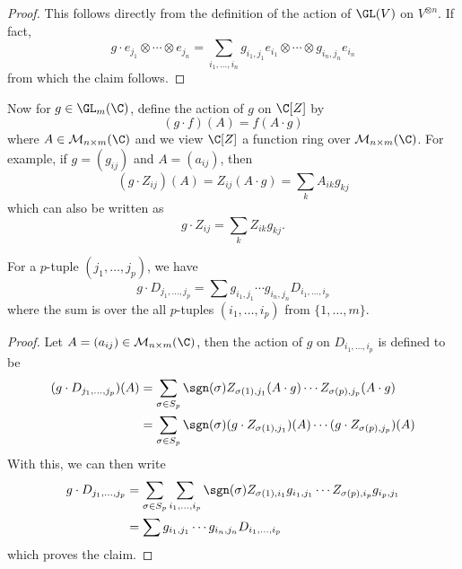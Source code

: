 \begin{proof}
This follows directly from the definition of the action of $\GL(V)$ on $V^{\otimes n}$. If fact,
\[g\cdot e_{j_1}\otimes\cdots\otimes e_{j_n}=\sum_{i_1,\dots,i_n} g_{i_1,j_1}e_{i_1}\otimes\cdots\otimes g_{i_n,j_n}e_{i_n}\]
from which the claim follows.
\end{proof}
Now for $g\in\GL_m(\C)$, define the action of $g$ on $\C[Z]$ by
\[(g\cdot f)(A)=f(A\cdot g)\]
where $A\in\mathcal{M}_{n\times m}(\C)$ and we view $\C[Z]$ a function ring over $\mathcal{M}_{n\times m}(\C)$. For example, if $g=(g_{ij})$ and $A=(a_{ij})$, then
\[(g\cdot Z_{ij})(A)=Z_{ij}(A\cdot g)=\sum_kA_{ik}g_{kj}\]
which can also be written as
\[g\cdot Z_{ij}=\sum_kZ_{ik}g_{kj}.\]
\begin{lemma}
For a $p$-tuple $(j_1,\dots,j_p)$, we have
\[g\cdot D_{j_1,\dots,j_p}=\sum g_{i_1,j_1}\cdots g_{i_n,j_n}D_{i_1,\dots,i_p}\]
where the sum is over the all $p$-tuples $(i_1,\dots,i_p)$ from $\{1,\dots,m\}$.
\end{lemma}
\begin{proof}
Let $A=(a_{ij})\in \mathcal{M}_{n\times m}(\C)$, then the action of $g$ on $D_{i_1,\dots,i_p}$ is defined to be
\begin{align*}
(g\cdot D_{j_1,\dots,j_p})(A)&=\sum_{\sigma\in S_p}\sgn(\sigma)Z_{\sigma(1),j_1}(A\cdot g)\cdots Z_{\sigma(p),j_p}(A\cdot g)\\
&=\sum_{\sigma\in S_p}\sgn(\sigma)(g\cdot Z_{\sigma(1),j_1})(A)\cdots(g\cdot Z_{\sigma(p),j_p})(A)
\end{align*}
With this, we can then write
\begin{align*}
g\cdot D_{j_1,\dots,j_p}&=\sum_{\sigma\in S_p}\sum_{i_1,\dots,i_p}\sgn(\sigma)Z_{\sigma(1),i_1}g_{i_1,j_1}\cdots Z_{\sigma(p),i_p}g_{i_p,j_1}\\
&=\sum g_{i_1,j_1}\cdots g_{i_n,j_n}D_{i_1,\dots,i_p}
\end{align*}
which proves the claim.
\end{proof}
